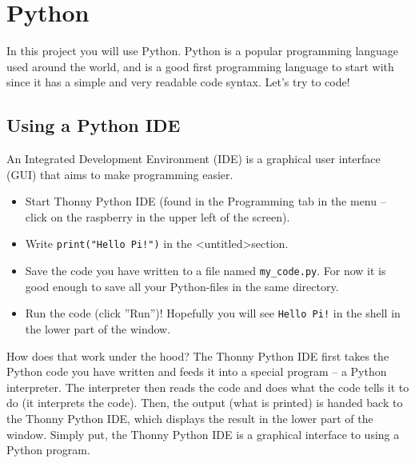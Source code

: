 \documentclass{article}
\begin{document}
\section{Python}
In this project you will use Python. Python is a popular programming language used around the world, and is a good first programming language to start with since it has a simple and very readable code syntax. Let's try to code!

\subsection{Using a Python IDE}
An Integrated Development Environment (IDE) is a graphical user interface (GUI) that aims to make programming easier.
\begin{itemize}
    \item[1.] Start Thonny Python IDE (found in the Programming tab in the menu -- click on the raspberry in the upper left of the screen).
    \item[2.] Write \texttt{print("Hello Pi!")} in the \textless untitled\textgreater  section.
    \item[3.] Save the code you have written to a file named \verb!my_code.py!. For now it is good enough to save all your Python-files in the same directory.
    \item[4.] Run the code (click ''Run'')! Hopefully you will see \texttt{Hello Pi!} in the shell in the lower part of the window.
\end{itemize}
How does that work under the hood? The Thonny Python IDE first takes the Python code you have written and feeds it into a special program -- a Python interpreter. The interpreter then reads the code and does what the code tells it to do (it interprets the code). Then, the output (what is printed) is handed back to the Thonny Python IDE, which displays the result in the lower part of the window.
Simply put, the Thonny Python IDE is a graphical interface to using a Python program.
\end{document}
